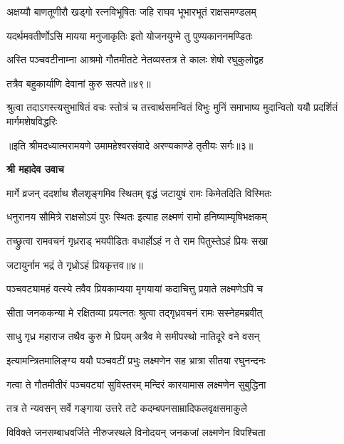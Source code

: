 \twolineshloka
{अक्षय्यौ बाणतूणीरौ खड्गो रत्नविभूषितः}
{जहि राघव भूभारभूतं राक्षसमण्डलम्} %

\twolineshloka
{यदर्थमवतीर्णोऽसि मायया मनुजाकृतिः}
{इतो योजनयुग्मे तु पुण्यकाननमण्डितः} %

\twolineshloka
{अस्ति पञ्चवटीनाम्ना आश्रमो गौतमीतटे}
{नेतव्यस्तत्र ते कालः शेषो रघुकुलोद्वह} %

{तत्रैव बहुकार्याणि देवानां कुरु सत्पते॥४९॥} %


\fourlineindentedshloka
{श्रुत्वा तदाऽगस्त्यसुभाषितं वचः}
{स्तोत्रं च तत्त्वार्थसमन्वितं विभुः}
{मुनिं समाभाष्य मुदान्वितो ययौ}
{प्रदर्शितं मार्गमशेषविद्धरिः} %

{॥इति श्रीमदध्यात्मरामयणे उमामहेश्वरसंवादे
अरण्यकाण्डे तृतीयः सर्गः॥३॥
}




\textbf{श्री महादेव उवाच}

\twolineshloka
{मार्गे व्रजन् ददर्शाथ शैलशृङ्गमिव स्थितम्}
{वृद्धं जटायुषं रामः किमेतदिति विस्मितः} %

\twolineshloka
{धनुरानय सौमित्रे राक्षसोऽयं पुरः स्थितः}
{इत्याह लक्ष्मणं रामो हनिष्याम्यृषिभक्षकम्} %

\twolineshloka
{तच्छ्रुत्वा रामवचनं गृध्रराड् भयपीडितः}
{वधार्होऽहं न ते राम पितुस्तेऽहं प्रियः सखा} %

{जटायुर्नाम भद्रं ते गृध्रोऽहं प्रियकृत्तव॥४॥} %


\twolineshloka
{पञ्चवट्यामहं वत्स्ये तवैव प्रियकाम्यया}
{मृगयायां कदाचित्तु प्रयाते लक्ष्मणेऽपि च} %

\twolineshloka
{सीता जनककन्या मे रक्षितव्या प्रयत्नतः}
{श्रुत्वा तद्गृध्रवचनं रामः सस्नेहमब्रवीत्} %

\twolineshloka
{साधु गृध्र महाराज तथैव कुरु मे प्रियम्}
{अत्रैव मे समीपस्थो नातिदूरे वने वसन्} %

\twolineshloka
{इत्यामन्त्रितमालिङ्ग्य ययौ पञ्चवटीं प्रभुः}
{लक्ष्मणेन सह भ्रात्रा सीतया रघुनन्दनः} %

\twolineshloka
{गत्वा ते गौतमीतीरं पञ्चवट्यां सुविस्तरम्}
{मन्दिरं कारयामास लक्ष्मणेन सुबुद्धिना} %

\twolineshloka
{तत्र ते न्यवसन् सर्वे गङ्गाया उत्तरे तटे}
{कदम्बपनसाम्रादिफलवृक्षसमाकुले} %

\twolineshloka
{विविक्ते जनसम्बाधवर्जिते नीरुजस्थले}
{विनोदयन् जनकजां लक्ष्मणेन विपश्चिता} %

